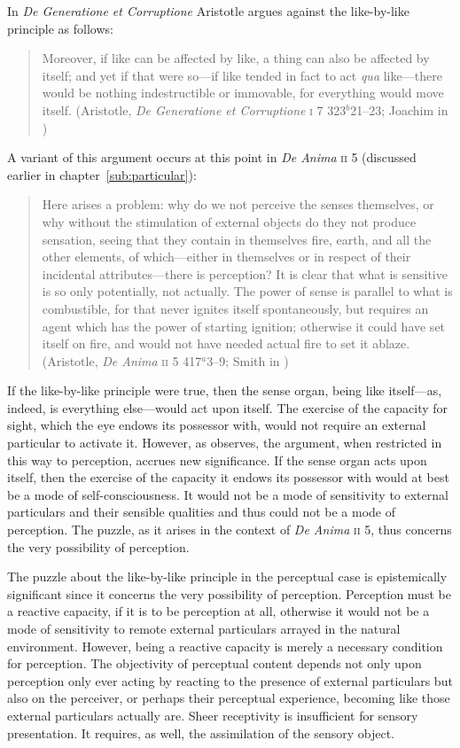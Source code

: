 In \emph{De Generatione et Corruptione} Aristotle argues against the like-by-like principle as follows:
\begin{quote}
	Moreover, if like can be affected by like, a thing can also be affected by itself; and yet if that were so---if like tended in fact to act \emph{qua} like---there would be nothing indestructible or immovable, for everything would move itself. (Aristotle, \emph{De Generatione et Corruptione} \textsc{i} 7 323\( ^{b} \)21--23; Joachim in \citealt[23]{Barnes:1984uq})
\end{quote}
A variant of this argument occurs at this point in \emph{De Anima} \textsc{ii} 5 (discussed earlier in chapter~\ref{sub:particular}): 
\begin{quote}
	Here arises a problem: why do we not perceive the senses themselves, or why without the stimulation of external objects do they not produce sensation, seeing that they contain in themselves fire, earth, and all the other elements, of which---either in themselves or in respect of their incidental attributes---there is perception? It is clear that what is sensitive is so only potentially, not actually. The power of sense is parallel to what is combustible, for that never ignites itself spontaneously, but requires an agent which has the power of starting ignition; otherwise it could have set itself on fire, and would not have needed actual fire to set it ablaze. (Aristotle, \emph{De Anima} \textsc{ii} 5 417\( ^{a} \)3--9; Smith in \citealt[29]{Barnes:1984uq})
\end{quote}
If the like-by-like principle were true, then the sense organ, being like itself---as, indeed, is everything else---would act upon itself. The exercise of the capacity for sight, which the eye endows its possessor with, would not require an external particular to activate it. However, as \citet[226--227]{Polansky:2007ly} observes, the argument, when restricted in this way to perception, accrues new significance. If the sense organ acts upon itself, then the exercise of the capacity it endows its possessor with would at best be a mode of self-consciousness. It would not be a mode of sensitivity to external particulars and their sensible qualities and thus could not be a mode of perception. The puzzle, as it arises in the context of \emph{De Anima} \textsc{ii} 5, thus concerns the very possibility of perception.

The puzzle about the like-by-like principle in the perceptual case is epistemically significant since it concerns the very possibility of perception. Perception must be a reactive capacity, if it is to be perception at all, otherwise it would not be a mode of sensitivity to remote external particulars arrayed in the natural environment. However, being a reactive capacity is merely a necessary condition for perception. The objectivity of perceptual content depends not only upon perception only ever acting by reacting to the presence of external particulars but also on the perceiver, or perhaps their perceptual experience, becoming like those external particulars actually are. Sheer receptivity is insufficient for sensory presentation. It requires, as well, the assimilation of the sensory object.

